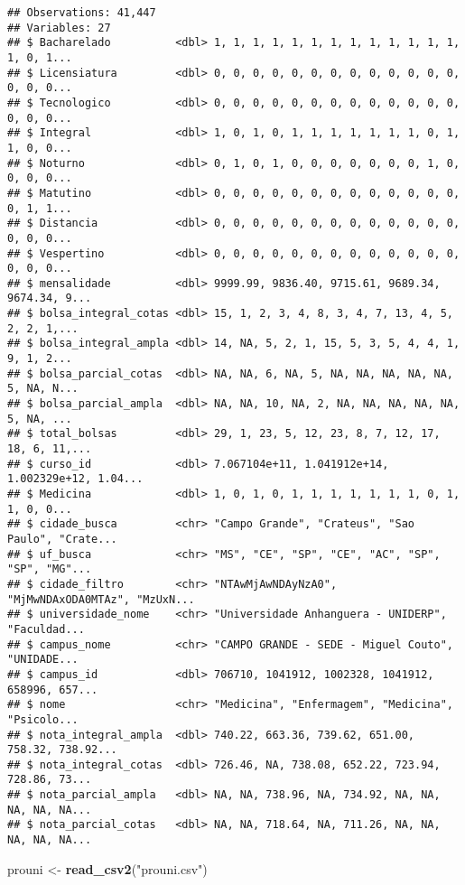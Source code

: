 \documentclass[
]{article}
\newenvironment{Shaded}{\begin{snugshade}}{\end{snugshade}}
\newcommand{\KeywordTok}[1]{\textcolor[rgb]{0.13,0.29,0.53}{\textbf{#1}}}
\newcommand{\NormalTok}[1]{#1}
\newcommand{\StringTok}[1]{\textcolor[rgb]{0.31,0.60,0.02}{#1}}
\begin{document}
\begin{verbatim}
## Observations: 41,447
## Variables: 27
## $ Bacharelado          <dbl> 1, 1, 1, 1, 1, 1, 1, 1, 1, 1, 1, 1, 1, 1, 0, 1...
## $ Licensiatura         <dbl> 0, 0, 0, 0, 0, 0, 0, 0, 0, 0, 0, 0, 0, 0, 0, 0...
## $ Tecnologico          <dbl> 0, 0, 0, 0, 0, 0, 0, 0, 0, 0, 0, 0, 0, 0, 0, 0...
## $ Integral             <dbl> 1, 0, 1, 0, 1, 1, 1, 1, 1, 1, 1, 0, 1, 1, 0, 0...
## $ Noturno              <dbl> 0, 1, 0, 1, 0, 0, 0, 0, 0, 0, 0, 1, 0, 0, 0, 0...
## $ Matutino             <dbl> 0, 0, 0, 0, 0, 0, 0, 0, 0, 0, 0, 0, 0, 0, 1, 1...
## $ Distancia            <dbl> 0, 0, 0, 0, 0, 0, 0, 0, 0, 0, 0, 0, 0, 0, 0, 0...
## $ Vespertino           <dbl> 0, 0, 0, 0, 0, 0, 0, 0, 0, 0, 0, 0, 0, 0, 0, 0...
## $ mensalidade          <dbl> 9999.99, 9836.40, 9715.61, 9689.34, 9674.34, 9...
## $ bolsa_integral_cotas <dbl> 15, 1, 2, 3, 4, 8, 3, 4, 7, 13, 4, 5, 2, 2, 1,...
## $ bolsa_integral_ampla <dbl> 14, NA, 5, 2, 1, 15, 5, 3, 5, 4, 4, 1, 9, 1, 2...
## $ bolsa_parcial_cotas  <dbl> NA, NA, 6, NA, 5, NA, NA, NA, NA, NA, 5, NA, N...
## $ bolsa_parcial_ampla  <dbl> NA, NA, 10, NA, 2, NA, NA, NA, NA, NA, 5, NA, ...
## $ total_bolsas         <dbl> 29, 1, 23, 5, 12, 23, 8, 7, 12, 17, 18, 6, 11,...
## $ curso_id             <dbl> 7.067104e+11, 1.041912e+14, 1.002329e+12, 1.04...
## $ Medicina             <dbl> 1, 0, 1, 0, 1, 1, 1, 1, 1, 1, 1, 0, 1, 1, 0, 0...
## $ cidade_busca         <chr> "Campo Grande", "Crateus", "Sao Paulo", "Crate...
## $ uf_busca             <chr> "MS", "CE", "SP", "CE", "AC", "SP", "SP", "MG"...
## $ cidade_filtro        <chr> "NTAwMjAwNDAyNzA0", "MjMwNDAxODA0MTAz", "MzUxN...
## $ universidade_nome    <chr> "Universidade Anhanguera - UNIDERP", "Faculdad...
## $ campus_nome          <chr> "CAMPO GRANDE - SEDE - Miguel Couto", "UNIDADE...
## $ campus_id            <dbl> 706710, 1041912, 1002328, 1041912, 658996, 657...
## $ nome                 <chr> "Medicina", "Enfermagem", "Medicina", "Psicolo...
## $ nota_integral_ampla  <dbl> 740.22, 663.36, 739.62, 651.00, 758.32, 738.92...
## $ nota_integral_cotas  <dbl> 726.46, NA, 738.08, 652.22, 723.94, 728.86, 73...
## $ nota_parcial_ampla   <dbl> NA, NA, 738.96, NA, 734.92, NA, NA, NA, NA, NA...
## $ nota_parcial_cotas   <dbl> NA, NA, 718.64, NA, 711.26, NA, NA, NA, NA, NA...
\end{verbatim}

\begin{Shaded}
\begin{Highlighting}[]
\NormalTok{prouni <-}\StringTok{ }\KeywordTok{read_csv2}\NormalTok{(}\StringTok{"prouni.csv"}\NormalTok{)}
\end{Highlighting}
\end{Shaded}
\end{document}
